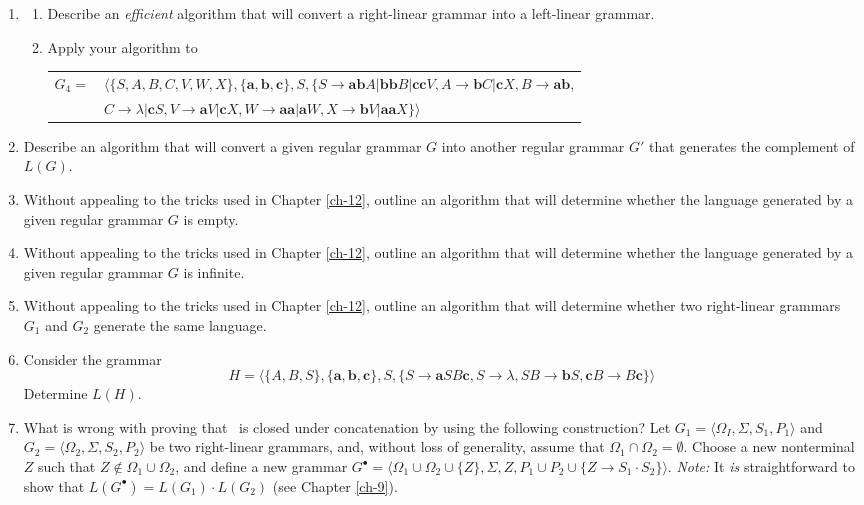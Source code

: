 \begin{enumerate}[{8.}1. ]
\item \begin{enumerate}
\item Describe an \emph{efficient} algorithm that will convert a right-linear
grammar into a left-linear grammar.
\item Apply your algorithm to
\begin{center}\begin{tabular}{r@{ }l}
$G_4 =$ & $\langle\{S,A,B,C,V,W,X\},\{\pmb{a},\pmb{b},\pmb{c}\},S,\{S\rightarrow
	\pmb{ab}A|\pmb{bb}B|\pmb{cc}V,A\rightarrow\pmb{b}C|\pmb{c}X,B\rightarrow
	\pmb{ab}$, \\
& $C\rightarrow\lambda|\pmb{c}S,V\rightarrow\pmb{a}V|\pmb{c}X,W\rightarrow
	\pmb{aa}|\pmb{a}W,X\rightarrow\pmb{b}V|\pmb{aa}X\}\rangle$
\end{tabular}\end{center}
\end{enumerate}

\item Describe an algorithm that will convert a given regular grammar $G$ into
another regular grammar $G'$ that generates the complement of $L(G)$.

\item Without appealing to the tricks used in Chapter \ref{ch-12}, outline an algorithm that
will determine whether the language generated by a given regular grammar $G$ is
empty.

\item Without appealing to the tricks used in Chapter \ref{ch-12}, outline an algorithm that
will determine whether the language generated by a given regular grammar $G$ is
infinite.

\item Without appealing to the tricks used in Chapter \ref{ch-12}, outline an algorithm that
will determine whether two right-linear grammars $G_1$ and $G_2$ generate the
same language.

\item Consider the grammar
\[ H = \langle\{A,B,S\},\{\pmb{a},\pmb{b},\pmb{c}\},S,\{S\rightarrow\pmb{a}SB
	\pmb{c},S\rightarrow\lambda,SB\rightarrow\pmb{b}S,\pmb{c}B\rightarrow
	B\pmb{c}\}\rangle \]
Determine $L(H)$.

\item What is wrong with proving that \GSIG\ is closed under concatenation by
using the following construction? Let $G_1 = \langle\Omega_I,\Sigma,S_1,P_1
\rangle$ and $G_2 = \langle\Omega_2,\Sigma,S_2,P_2\rangle$ be two right-linear
grammars, and, without loss of generality, assume that $\Omega_1\cap\Omega_2 =
\emptyset$. Choose a new nonterminal $Z$ such that $Z\not \in\Omega_1\cup\Omega_2$,
and define a new grammar $G^\bullet = \langle\Omega_1\cup\Omega_2\cup\{Z\},\Sigma,Z,
P_1\cup P_2\cup\{Z\rightarrow S_1\cdot S_2\}\rangle$. \emph{Note:} It \emph{is}
straightforward to show that $L(G^\bullet)=L(G_1)\cdot L(G_2)$ (see Chapter \ref{ch-9}).


\end{enumerate}

